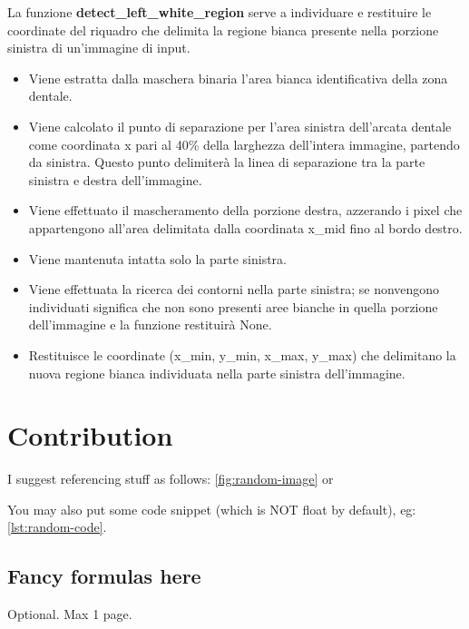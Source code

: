 \documentclass[12pt,a4paper,openright,twoside]{book}
\begin{document}
La funzione \textbf{detect\_left\_white\_region} serve a individuare e restituire le coordinate del riquadro che delimita la regione bianca presente nella porzione sinistra di un'immagine di input.
\begin{itemize}
\item Viene estratta dalla maschera binaria l'area bianca identificativa della zona dentale.
\item Viene calcolato il punto di separazione per l'area sinistra dell'arcata dentale come coordinata x pari al 40\% della larghezza dell'intera immagine, partendo da sinistra. Questo punto delimiterà la linea di separazione tra la parte sinistra e destra dell'immagine.
\item Viene effettuato il mascheramento della porzione destra, azzerando i pixel che appartengono all'area delimitata dalla coordinata x\_mid fino al bordo destro.
\item Viene mantenuta intatta solo la parte sinistra.
\item Viene effettuata la ricerca dei contorni nella parte sinistra; se nonvengono individuati significa che non sono presenti aree bianche in quella porzione dell'immagine e la funzione restituirà None.
\item Restituisce le coordinate (x\_min, y\_min, x\_max, y\_max) che delimitano la nuova regione bianca individuata nella parte sinistra dell’immagine.
\end{itemize}



\chapter{Contribution}
I suggest referencing stuff as follows: \cref{fig:random-image} or 

You may also put some code snippet (which is NOT float by default), eg: \cref{lst:random-code}.



\section{Fancy formulas here}


\backmatter

\nocite{*} %




\begin{acknowledgements} %
Optional. Max 1 page.
\end{acknowledgements}
\end{document}
